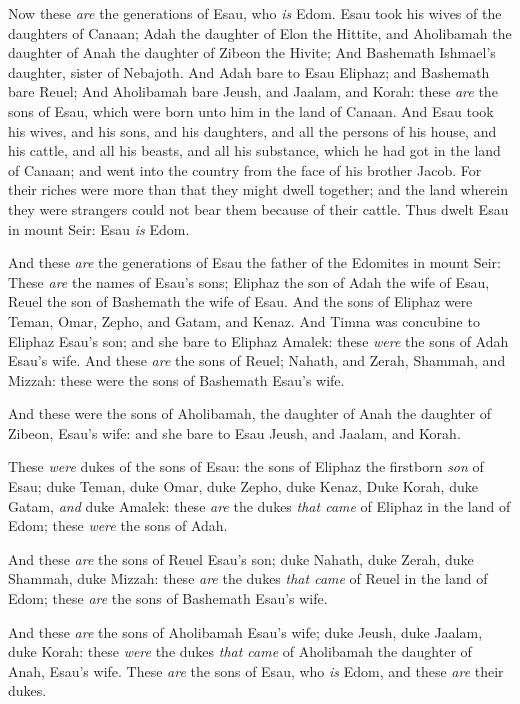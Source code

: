 \documentclass[11pt,letterpaper,oneside]{memoir}
\begin{document}
Now these \emph{are} the generations of Esau, who \emph{is} Edom. Esau
took his wives of the daughters of Canaan; Adah the daughter of Elon the
Hittite, and Aholibamah the daughter of Anah the daughter of Zibeon the
Hivite; And Bashemath Ishmael's daughter, sister of Nebajoth. And Adah
bare to Esau Eliphaz; and Bashemath bare Reuel; And Aholibamah bare
Jeush, and Jaalam, and Korah: these \emph{are} the sons of Esau, which
were born unto him in the land of Canaan. And Esau took his wives, and
his sons, and his daughters, and all the persons of his house, and his
cattle, and all his beasts, and all his substance, which he had got in
the land of Canaan; and went into the country from the face of his
brother Jacob. For their riches were more than that they might dwell
together; and the land wherein they were strangers could not bear them
because of their cattle. Thus dwelt Esau in mount Seir: Esau \emph{is}
Edom.

And these \emph{are} the generations of Esau the father of the Edomites
in mount Seir: These \emph{are} the names of Esau's sons; Eliphaz the
son of Adah the wife of Esau, Reuel the son of Bashemath the wife of
Esau. And the sons of Eliphaz were Teman, Omar, Zepho, and Gatam, and
Kenaz. And Timna was concubine to Eliphaz Esau's son; and she bare to
Eliphaz Amalek: these \emph{were} the sons of Adah Esau's wife. And
these \emph{are} the sons of Reuel; Nahath, and Zerah, Shammah, and
Mizzah: these were the sons of Bashemath Esau's wife.

And these were the sons of Aholibamah, the daughter of Anah the daughter
of Zibeon, Esau's wife: and she bare to Esau Jeush, and Jaalam, and
Korah.

These \emph{were} dukes of the sons of Esau: the sons of Eliphaz the
firstborn \emph{son} of Esau; duke Teman, duke Omar, duke Zepho, duke
Kenaz, Duke Korah, duke Gatam, \emph{and} duke Amalek: these \emph{are}
the dukes \emph{that came} of Eliphaz in the land of Edom; these
\emph{were} the sons of Adah.

And these \emph{are} the sons of Reuel Esau's son; duke Nahath, duke
Zerah, duke Shammah, duke Mizzah: these \emph{are} the dukes \emph{that came}
of Reuel in the land of Edom; these \emph{are} the sons of Bashemath
Esau's wife.

And these \emph{are} the sons of Aholibamah Esau's wife; duke Jeush,
duke Jaalam, duke Korah: these \emph{were} the dukes \emph{that came} of
Aholibamah the daughter of Anah, Esau's wife. These \emph{are} the sons
of Esau, who \emph{is} Edom, and these \emph{are} their dukes.
\end{document}

